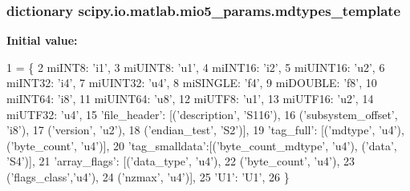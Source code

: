 \subsubsection[{mdtypes\+\_\+template}]{\setlength{\rightskip}{0pt plus 5cm}dictionary scipy.\+io.\+matlab.\+mio5\+\_\+params.\+mdtypes\+\_\+template}\label{namespacescipy_1_1io_1_1matlab_1_1mio5__params_a155ba11a55a9e662d4dfae9ffb1763e1}
{\bfseries Initial value\+:}
\begin{DoxyCode}
1 = \{
2     miINT8: \textcolor{stringliteral}{'i1'},
3     miUINT8: \textcolor{stringliteral}{'u1'},
4     miINT16: \textcolor{stringliteral}{'i2'},
5     miUINT16: \textcolor{stringliteral}{'u2'},
6     miINT32: \textcolor{stringliteral}{'i4'},
7     miUINT32: \textcolor{stringliteral}{'u4'},
8     miSINGLE: \textcolor{stringliteral}{'f4'},
9     miDOUBLE: \textcolor{stringliteral}{'f8'},
10     miINT64: \textcolor{stringliteral}{'i8'},
11     miUINT64: \textcolor{stringliteral}{'u8'},
12     miUTF8: \textcolor{stringliteral}{'u1'},
13     miUTF16: \textcolor{stringliteral}{'u2'},
14     miUTF32: \textcolor{stringliteral}{'u4'},
15     \textcolor{stringliteral}{'file\_header'}: [(\textcolor{stringliteral}{'description'}, \textcolor{stringliteral}{'S116'}),
16                     (\textcolor{stringliteral}{'subsystem\_offset'}, \textcolor{stringliteral}{'i8'}),
17                     (\textcolor{stringliteral}{'version'}, \textcolor{stringliteral}{'u2'}),
18                     (\textcolor{stringliteral}{'endian\_test'}, \textcolor{stringliteral}{'S2'})],
19     \textcolor{stringliteral}{'tag\_full'}: [(\textcolor{stringliteral}{'mdtype'}, \textcolor{stringliteral}{'u4'}), (\textcolor{stringliteral}{'byte\_count'}, \textcolor{stringliteral}{'u4'})],
20     \textcolor{stringliteral}{'tag\_smalldata'}:[(\textcolor{stringliteral}{'byte\_count\_mdtype'}, \textcolor{stringliteral}{'u4'}), (\textcolor{stringliteral}{'data'}, \textcolor{stringliteral}{'S4'})],
21     \textcolor{stringliteral}{'array\_flags'}: [(\textcolor{stringliteral}{'data\_type'}, \textcolor{stringliteral}{'u4'}),
22                     (\textcolor{stringliteral}{'byte\_count'}, \textcolor{stringliteral}{'u4'}),
23                     (\textcolor{stringliteral}{'flags\_class'},\textcolor{stringliteral}{'u4'}),
24                     (\textcolor{stringliteral}{'nzmax'}, \textcolor{stringliteral}{'u4'})],
25     \textcolor{stringliteral}{'U1'}: \textcolor{stringliteral}{'U1'},
26     \}
\end{DoxyCode}
\hypertarget{namespacescipy_1_1io_1_1matlab_1_1mio5__params_ada6a7915a4b74d9380bf489f032e124a}{}
